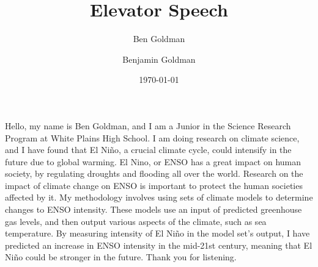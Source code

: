 \documentclass{basic}
\author{Ben Goldman}
\author{Benjamin Goldman}
\date{\today}
\title{Elevator Speech}
\begin{document}
\maketitle
Hello, my name is Ben Goldman, and I am a Junior in the Science Research Program at White Plains High School. I am doing research on climate science, and I have found that El Niño, a crucial climate cycle, could intensify in the future due to global warming. El Nino, or ENSO has a great impact on human society, by regulating droughts and flooding all over the world. Research on the impact of climate change on ENSO is important to protect the human societies affected by it. My methodology involves using sets of climate models to determine changes to ENSO intensity. These models use an input of predicted greenhouse gas levels, and then output various aspects of the climate, such as sea temperature. By measuring intensity of El Niño in the model set’s output, I have predicted an increase in ENSO intensity in the mid-21st century, meaning that El Niño could be stronger in the future. Thank you for listening.
\end{document}
